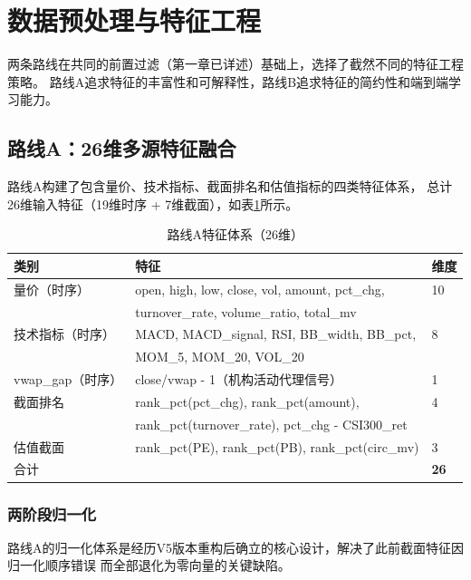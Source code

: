 \documentclass[12pt,a4paper]{ctexart}
\begin{document}
\section{数据预处理与特征工程}

两条路线在共同的前置过滤（第一章已详述）基础上，选择了截然不同的特征工程策略。
路线A追求特征的丰富性和可解释性，路线B追求特征的简约性和端到端学习能力。

\subsection{路线A：26维多源特征融合}

路线A构建了包含量价、技术指标、截面排名和估值指标的四类特征体系，
总计26维输入特征（19维时序 + 7维截面），如表\ref{tab:routeA_features}所示。

\begin{table}[htbp]
\centering
\caption{路线A特征体系（26维）}
\label{tab:routeA_features}
\small
\begin{tabular}{lll}
\toprule
类别 & 特征 & 维度 \\
\midrule
量价（时序） & open, high, low, close, vol, amount, pct\_chg, & 10 \\
             & turnover\_rate, volume\_ratio, total\_mv & \\
技术指标（时序） & MACD, MACD\_signal, RSI, BB\_width, BB\_pct, & 8 \\
                & MOM\_5, MOM\_20, VOL\_20 & \\
vwap\_gap（时序） & close/vwap - 1（机构活动代理信号） & 1 \\
\hline
截面排名 & rank\_pct(pct\_chg), rank\_pct(amount), & 4 \\
          & rank\_pct(turnover\_rate), pct\_chg - CSI300\_ret & \\
估值截面 & rank\_pct(PE), rank\_pct(PB), rank\_pct(circ\_mv) & 3 \\
\midrule
合计 & & \textbf{26} \\
\bottomrule
\end{tabular}
\end{table}

\subsubsection{两阶段归一化}

路线A的归一化体系是经历V5版本重构后确立的核心设计，解决了此前截面特征因归一化顺序错误
而全部退化为零向量的关键缺陷。
\end{document}
